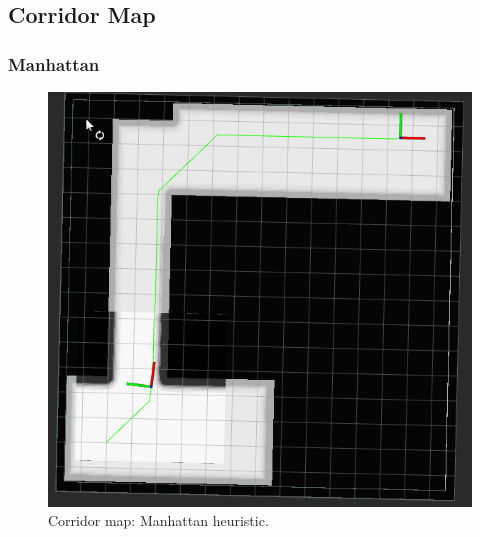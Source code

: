 \documentclass{article}
\begin{document}
\clearpage


\subsection*{Corridor Map}

\subsubsection*{Manhattan}
\begin{figure}[!ht]
    \centering
    \includegraphics[width=0.9\columnwidth]{../images/manhattan_corridor.png}
    \caption{Corridor map: Manhattan heuristic.}
    \label{fig:manhattan_open}
\end{figure}
\clearpage
\end{document}
